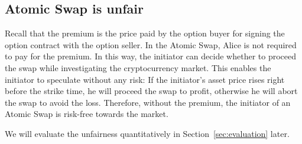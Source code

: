 \subsection{Atomic Swap is unfair}
Recall that the premium is the price paid by the option buyer for signing the option contract with the option seller.
In the Atomic Swap, Alice is not required to pay for the premium.
In this way, the initiator can decide whether to proceed the swap while investigating the cryptocurrency market.
This enables the initiator to speculate without any risk: If the initiator's asset price rises right before the strike time, he will proceed the swap to profit, otherwise he will abort the swap to avoid the loss.
Therefore, without the premium, the initiator of an Atomic Swap is risk-free towards the market.

We will evaluate the unfairness quantitatively in Section~\ref{sec:evaluation} later.